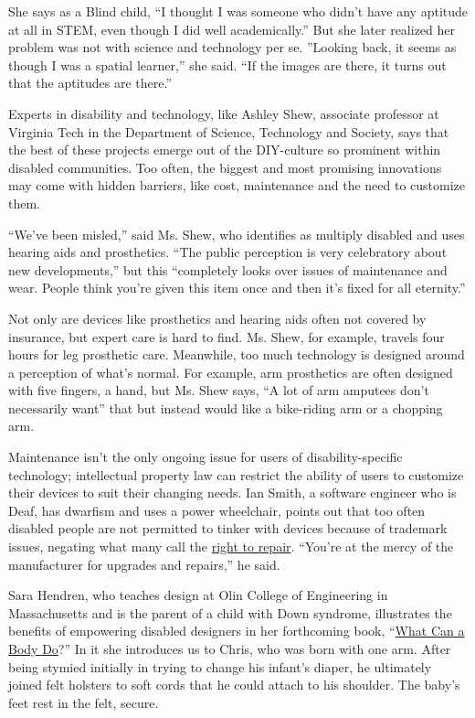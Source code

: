 She says as a Blind child, ``I thought I was someone who didn't have any
aptitude at all in STEM, even though I did well academically.'' But she
later realized her problem was not with science and technology per se.
''Looking back, it seems as though I was a spatial learner,'' she said.
``If the images are there, it turns out that the aptitudes are there.''

Experts in disability and technology, like Ashley Shew, associate
professor at Virginia Tech in the Department of Science, Technology and
Society, says that the best of these projects emerge out of the
DIY-culture so prominent within disabled communities. Too often, the
biggest and most promising innovations may come with hidden barriers,
like cost, maintenance and the need to customize them.

``We've been misled,'' said Ms. Shew, who identifies as multiply
disabled and uses hearing aids and prosthetics. ``The public perception
is very celebratory about new developments,'' but this ``completely
looks over issues of maintenance and wear. People think you're given
this item once and then it's fixed for all eternity.''

Not only are devices like prosthetics and hearing aids often not covered
by insurance, but expert care is hard to find. Ms. Shew, for example,
travels four hours for leg prosthetic care. Meanwhile, too much
technology is designed around a perception of what's normal. For
example, arm prosthetics are often designed with five fingers, a hand,
but Ms. Shew says, ``A lot of arm amputees don't necessarily want'' that
but instead would like a bike-riding arm or a chopping arm.

Maintenance isn't the only ongoing issue for users of
disability-specific technology; intellectual property law can restrict
the ability of users to customize their devices to suit their changing
needs. Ian Smith, a software engineer who is Deaf, has dwarfism and uses
a power wheelchair, points out that too often disabled people are not
permitted to tinker with devices because of trademark issues, negating
what many call the
\href{https://www.eff.org/issues/right-to-repair}{right to repair}.
``You're at the mercy of the manufacturer for upgrades and repairs,'' he
said.

Sara Hendren, who teaches design at Olin College of Engineering in
Massachusetts and is the parent of a child with Down syndrome,
illustrates the benefits of empowering disabled designers in her
forthcoming book,
``\href{https://www.penguinrandomhouse.com/books/561049/what-can-a-body-do-by-sara-hendren/\#:~:text=In\%20a\%20series\%20of\%20vivid,and\%20settings\%20we\%20live\%20with.}{What
Can a Body Do}?'' In it she introduces us to Chris, who was born with
one arm. After being stymied initially in trying to change his infant's
diaper, he ultimately joined felt holsters to soft cords that he could
attach to his shoulder. The baby's feet rest in the felt, secure.

